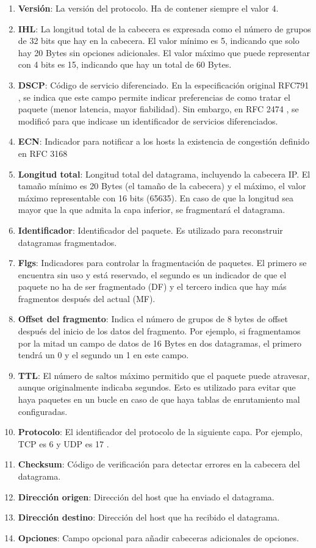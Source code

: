 \begin{enumerate}
    \item \textbf{Versión}: La versión del protocolo. Ha de contener siempre el valor 4.
    \item \textbf{IHL}: La longitud total de la cabecera es expresada como el número de grupos de 32 bits que hay en la cabecera. El valor mínimo es 5, indicando que solo hay 20 Bytes sin opciones adicionales. El valor máximo que puede representar con 4 bits es 15, indicando que hay un total de 60 Bytes.
    \item \textbf{DSCP}: Código de servicio diferenciado. En la especificación original RFC791 \cite{rfc791}, se indica que este campo permite indicar preferencias de como tratar el paquete (menor latencia, mayor fiabilidad). Sin embargo, en RFC 2474 \cite{rfc2474}, se modificó para que indicase un identificador de servicios diferenciados.
    \item \textbf{ECN}: Indicador para notificar a los hosts la existencia de congestión definido en RFC 3168 \cite{rfc3168}
    \item \textbf{Longitud total}: Longitud total del datagrama, incluyendo la cabecera IP. El tamaño mínimo es 20 Bytes (el tamaño de la cabecera) y el máximo, el valor máximo representable con 16 bits (65635). En caso de que la longitud sea mayor que la que admita la capa inferior, se fragmentará el datagrama.
    \item \textbf{Identificador}: Identificador del paquete. Es utilizado para reconstruir datagramas fragmentados.
    \item \textbf{Flgs}: Indicadores para controlar la fragmentación de paquetes. El primero se encuentra sin uso y está reservado, el segundo es un indicador de que el paquete no ha de ser fragmentado (DF) y el tercero indica que hay más fragmentos después del actual (MF).
    \item \textbf{Offset del fragmento}: Indica el número de grupos de 8 bytes de offset después del inicio de los datos del fragmento. Por ejemplo, si fragmentamos por la mitad un campo de datos de 16 Bytes en dos datagramas, el primero tendrá un 0 y el segundo un 1 en este campo.
    \item \textbf{TTL}: El número de saltos máximo permitido que el paquete puede atravesar, aunque originalmente indicaba segundos. Esto es utilizado para evitar que haya paquetes en un bucle en caso de que haya tablas de enrutamiento mal configuradas.
    \item \textbf{Protocolo}: El identificador del protocolo de la siguiente capa. Por ejemplo, TCP es 6 y UDP es 17 \cite{ipprotocolnumbers}.
    \item \textbf{Checksum}: Código de verificación para detectar errores en la cabecera del datagrama.
    \item \textbf{Dirección origen}: Dirección del host que ha enviado el datagrama.
    \item \textbf{Dirección destino}: Dirección del host que ha recibido el datagrama.
    \item \textbf{Opciones}: Campo opcional para añadir cabeceras adicionales de opciones.
\end{enumerate}

